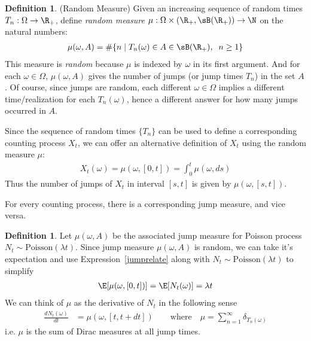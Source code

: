 \documentclass[12pt]{article}
\theoremstyle{plain}
\theoremstyle{definition}
\newtheorem{defn}[thm]{Definition}
\theoremstyle{remark}
\newcommand{\ra}{\rightarrow}
\begin{document}
\begin{defn}(Random Measure)
Given  an increasing sequence of random times $T_n:\Omega\ra\R_+$,
define \emph{random measure} $\mu:\Omega\times(\R_+,\sB(\R_+))\ra \N$ on
the natural numbers:
\begin{align*}
  \mu(\omega,A)
  =
  \#\{
    n
    \;|\;
    T_n(\omega)\in A\in\sB(\R_+),\;\; n\geq 1
  \}
\end{align*}
This measure is \emph{random} because $\mu$ is indexed by $\omega$ in
its first argument.
And for each $\omega\in\Omega$, $\mu(\omega,A)$ gives the number of
jumps (or jump times $T_n$) in the set $A$.
Of course, since jumps are random, each different $\omega\in\Omega$
implies a different time/realization for each $T_n(\omega)$, hence a
different answer for how many jumps occurred in $A$.

Since the sequence of random times $\{T_n\}$ can be used to define a
corresponding counting process $X_t$, we can offer an alternative
definition of $X_t$ using the random measure $\mu$:
\begin{align}
  X_t(\omega)
  =
  \mu(\omega,[0,t])
  =
  \int_0^t
  \mu(\omega,ds)
  \label{jumprelate}
\end{align}
Thus the number of jumps of $X_t$ in interval $[s,t]$ is given by
$\mu(\omega,[s,t])$.

For every counting process, there is a corresponding jump measure, and
vice versa.
\end{defn}

\begin{defn}
Let $\mu(\omega,A)$ be the associated jump measure for Poisson process
$N_t\sim\text{Poisson}(\lambda t)$.
Since jump measure $\mu(\omega,A)$ is random, we can take it's
expectation and use Expression~\ref{jumprelate} along with
$N_t\sim\text{Poisson}(\lambda t)$
to simplify
\begin{align*}
  \E[\mu(\omega,[0,t])]
  =
  \E[N_t(\omega)]
  =
  \lambda t
\end{align*}
We can think of $\mu$ as the derivative of $N_t$ in the following sense
\begin{align*}
  \frac{dN_t(\omega)}{dt}
  &=
  \mu(\omega,[t,t+dt])
  \qquad\text{where}\quad
  \mu
  = \sum_{n=1}^\infty \delta_{T_n(\omega)}
\end{align*}
i.e. $\mu$ is the sum of Dirac measures at all jump times.
\end{defn}
\end{document}
